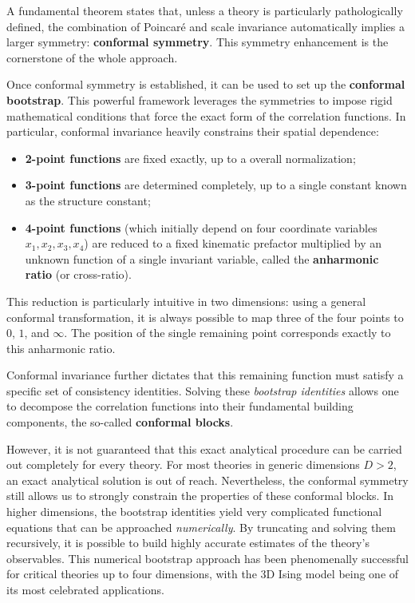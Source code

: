 A fundamental theorem states that, unless a theory is particularly pathologically defined, the combination of Poincar\'e and scale invariance automatically implies a larger symmetry: \textbf{conformal symmetry}. This symmetry enhancement is the cornerstone of the whole approach.

Once conformal symmetry is established, it can be used to set up the \textbf{conformal bootstrap}. This powerful framework leverages the symmetries to impose rigid mathematical conditions that force the exact form of the correlation functions. In particular, conformal invariance heavily constrains their spatial dependence:
\begin{itemize}
    \item \textbf{2-point functions} are fixed exactly, up to a overall normalization;
    \item \textbf{3-point functions} are determined completely, up to a single constant known as the structure constant;
    \item \textbf{4-point functions} (which initially depend on four coordinate variables \(x_1, x_2, x_3, x_4\)) are reduced to a fixed kinematic prefactor multiplied by an unknown function of a single invariant variable, called the \textbf{anharmonic ratio} (or cross-ratio).
\end{itemize}

This reduction is particularly intuitive in two dimensions: using a general conformal transformation, it is always possible to map three of the four points to \(0\), \(1\), and \(\infty\). The position of the single remaining point corresponds exactly to this anharmonic ratio.

Conformal invariance further dictates that this remaining function must satisfy a specific set of consistency identities. Solving these \textit{bootstrap identities} allows one to decompose the correlation functions into their fundamental building components, the so-called \textbf{conformal blocks}.

However, it is not guaranteed that this exact analytical procedure can be carried out completely for every theory. For most theories in generic dimensions \(D > 2\), an exact analytical solution is out of reach. Nevertheless, the conformal symmetry still allows us to strongly constrain the properties of these conformal blocks. In higher dimensions, the bootstrap identities yield very complicated functional equations that can be approached \textit{numerically}. By truncating and solving them recursively, it is possible to build highly accurate estimates of the theory's observables. This numerical bootstrap approach has been phenomenally successful for critical theories up to four dimensions, with the 3D Ising model being one of its most celebrated applications.

